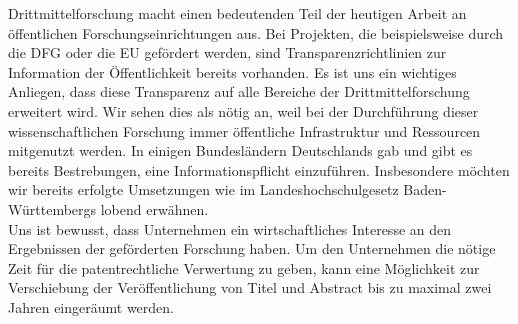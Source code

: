 \documentclass[DIV=9]{scrartcl}
\begin{document}
Drittmittelforschung macht einen bedeutenden Teil der heutigen Arbeit an öffentlichen Forschungseinrichtungen aus. Bei Projekten, die beispielsweise durch die DFG oder die EU gefördert werden, sind Transparenzrichtlinien zur Information der Öffentlichkeit bereits vorhanden. Es ist uns ein wichtiges Anliegen, dass diese Transparenz auf alle Bereiche der Drittmittelforschung erweitert wird. Wir sehen dies als nötig an, weil bei der Durchführung dieser wissenschaftlichen Forschung immer öffentliche Infrastruktur und Ressourcen mitgenutzt werden. In einigen Bundesländern Deutschlands gab und gibt es bereits Bestrebungen, eine Informationspflicht einzuführen. Insbesondere möchten wir bereits erfolgte Umsetzungen wie im Landeshochschulgesetz Baden-Württembergs lobend erwähnen.\\
Uns ist bewusst, dass Unternehmen ein wirtschaftliches Interesse an den Ergebnissen der geförderten Forschung haben. Um den Unternehmen die nötige Zeit für die patentrechtliche Verwertung zu geben, kann eine Möglichkeit zur Verschiebung der Veröffentlichung von Titel und Abstract bis zu maximal zwei Jahren eingeräumt werden.
\end{document}
